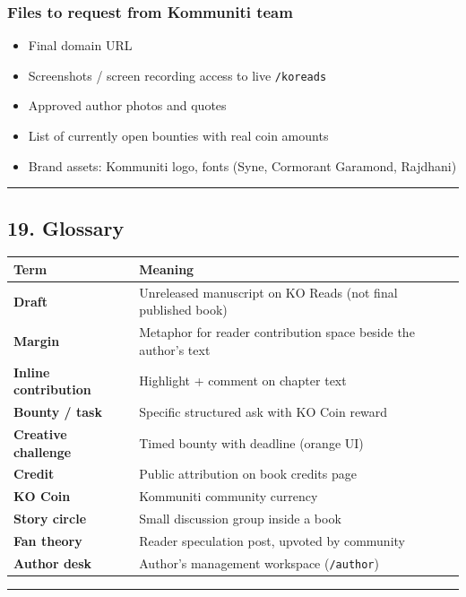 \documentclass[11pt,a4paper]{report}
\begin{document}
\subsubsection{Files to request from Kommuniti team}
\begin{itemize}
  \item [ ] Final domain URL
  \item [ ] Screenshots / screen recording access to live \texttt{/koreads}
  \item [ ] Approved author photos and quotes
  \item [ ] List of currently open bounties with real coin amounts
  \item [ ] Brand assets: Kommuniti logo, fonts (Syne, Cormorant Garamond, Rajdhani)
\end{itemize}

\medskip\hrule\medskip

\subsection{19. Glossary}

\begin{longtable}{|l|l|}
\hline
Term & Meaning \\ \hline
\textbf{Draft} & Unreleased manuscript on KO Reads (not final published book) \\ \hline
\textbf{Margin} & Metaphor for reader contribution space beside the author’s text \\ \hline
\textbf{Inline contribution} & Highlight + comment on chapter text \\ \hline
\textbf{Bounty / task} & Specific structured ask with KO Coin reward \\ \hline
\textbf{Creative challenge} & Timed bounty with deadline (orange UI) \\ \hline
\textbf{Credit} & Public attribution on book credits page \\ \hline
\textbf{KO Coin} & Kommuniti community currency \\ \hline
\textbf{Story circle} & Small discussion group inside a book \\ \hline
\textbf{Fan theory} & Reader speculation post, upvoted by community \\ \hline
\textbf{Author desk} & Author’s management workspace (\texttt{/author}) \\
\hline
\end{longtable}


\medskip\hrule\medskip
\end{document}
